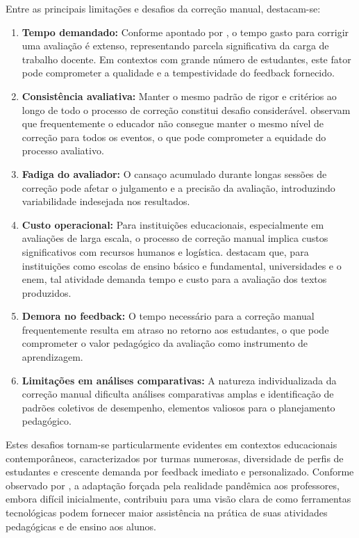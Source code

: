 Entre as principais limitações e desafios da correção manual, destacam-se:
\begin{enumerate}
    \item \textbf{Tempo demandado:} Conforme apontado por , o tempo gasto para corrigir uma avaliação é extenso, representando parcela significativa da carga de trabalho docente. Em contextos com grande número de estudantes, este fator pode comprometer a qualidade e a tempestividade do feedback fornecido.
    
    \item \textbf{Consistência avaliativa:} Manter o mesmo padrão de rigor e critérios ao longo de todo o processo de correção constitui desafio considerável.  observam que frequentemente o educador não consegue manter o mesmo nível de correção para todos os eventos, o que pode comprometer a equidade do processo avaliativo.

    \item \textbf{Fadiga do avaliador:} O cansaço acumulado durante longas sessões de correção pode afetar o julgamento e a precisão da avaliação, introduzindo variabilidade indesejada nos resultados.

    \item \textbf{Custo operacional:} Para instituições educacionais, especialmente em avaliações de larga escala, o processo de correção manual implica custos significativos com recursos humanos e logística.  destacam que, para instituições como escolas de ensino básico e fundamental, universidades e o \gls{enem}, tal atividade demanda tempo e custo para a avaliação dos textos produzidos.

    \item \textbf{Demora no feedback:} O tempo necessário para a correção manual frequentemente resulta em atraso no retorno aos estudantes, o que pode comprometer o valor pedagógico da avaliação como instrumento de aprendizagem.

    \item \textbf{Limitações em análises comparativas:} A natureza individualizada da correção manual dificulta análises comparativas amplas e identificação de padrões coletivos de desempenho, elementos valiosos para o planejamento pedagógico.
\end{enumerate}

Estes desafios tornam-se particularmente evidentes em contextos educacionais contemporâneos, caracterizados por turmas numerosas, diversidade de perfis de estudantes e crescente demanda por feedback imediato e personalizado. Conforme observado por , a adaptação forçada pela realidade pandêmica aos professores, embora difícil inicialmente, contribuiu para uma visão clara de como ferramentas tecnológicas podem fornecer maior assistência na prática de suas atividades pedagógicas e de ensino aos alunos.

